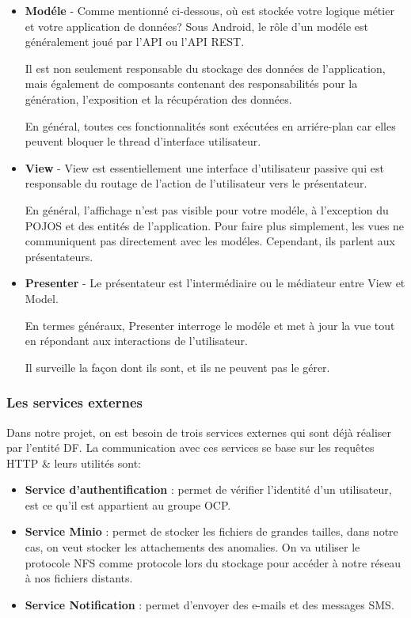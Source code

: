 \begin{itemize}

\item \textbf{Mod\'ele} - Comme mentionn\'e ci-dessous, o\`u est stock\'ee votre logique m\'etier et votre application de donn\'ees? Sous Android, le r\^ole d'un mod\'ele est g\'en\'eralement jou\'e par l'\gls{API} ou l'\gls{API} \gls{REST}.

Il est non seulement responsable du stockage des donn\'ees de l'application, mais \'egalement de composants contenant des responsabilit\'es pour la g\'en\'eration, l'exposition et la r\'ecup\'eration des donn\'ees.

En g\'en\'eral, toutes ces fonctionnalit\'es sont ex\'ecut\'ees en arri\'ere-plan car elles peuvent bloquer le thread d'interface utilisateur.

\item \textbf{View} - View est essentiellement une interface d'utilisateur passive qui est responsable du routage de l'action de l'utilisateur vers le pr\'esentateur. 

En g\'en\'eral, l'affichage n'est pas visible pour votre mod\'ele, \`a l'exception du POJOS et des entit\'es de l'application. Pour faire plus simplement, les vues ne communiquent pas directement avec les mod\'eles. Cependant, ils parlent aux pr\'esentateurs.

\item \textbf{Presenter} - Le pr\'esentateur est l'interm\'ediaire ou le m\'ediateur entre View et Model.

En termes g\'en\'eraux, Presenter interroge le mod\'ele et met \`a jour la vue tout en r\'epondant aux interactions de l'utilisateur.

Il surveille la fa\c{c}on dont ils sont, et ils ne peuvent pas le g\'erer.

\end{itemize}

\subsubsection{Les services externes}

Dans notre projet, on est besoin de trois services externes qui sont d\'ej\`a r\'ealiser par l'entit\'e \gls{DF}. La communication avec ces services se base sur les requ\^etes \gls{HTTP} \& leurs utilit\'es sont:
\begin{itemize}
\item \textbf{Service d'authentification} : permet de v\'erifier l'identit\'e d'un utilisateur, est ce qu'il est appartient au groupe \gls{OCP}.
\item \textbf{Service Minio} : permet de stocker les fichiers de grandes tailles, dans notre cas, on veut stocker les attachements des anomalies. On va utiliser le protocole \gls{NFS} comme protocole lors du stockage pour accéder \`a notre réseau \`a nos fichiers distants.
\item \textbf{Service Notification} : permet d'envoyer des e-mails et des messages \gls{SMS}.
\end{itemize}


